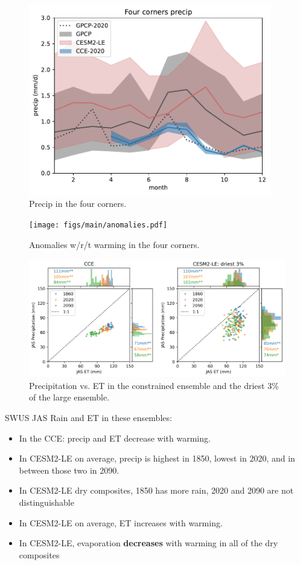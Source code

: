 \documentclass[11pt]{article}
\begin{document}
\begin{figure}[h]
\centering
\includegraphics[width=25pc]{figs/main/precip.pdf}
\caption{Precip in the four corners.}
\label{fig:precip}
\end{figure}


\newpage

\begin{figure}[h]
\centering
\texttt{[image: figs/main/anomalies.pdf]}
\caption{Anomalies w/r/t warming in the four corners.}
\label{fig:anomalies}
\end{figure}


\newpage
\begin{figure}[h]
\centering
\includegraphics[width=40pc]{figs/main/scatter_ET_P.png}
\caption{Precipitation vs. ET in the constrained ensemble and the driest 3\% of the large ensemble.}
\label{fig:precip}
\end{figure}



SWUS JAS Rain and ET in these ensembles:
\begin{itemize}
    \item In the CCE: precip and ET decrease with warming.
    \item In CESM2-LE on average, precip is highest in 1850, lowest in 2020, and in between those two in 2090.
    \item In CESM2-LE dry composites, 1850 has more rain, 2020 and 2090 are not distinguishable
    \item In CESM2-LE on average, ET increases with warming.
    \item In CESM2-LE, evaporation \textbf{decreases} with warming in all of the dry composites    
\end{itemize}
\end{document}
